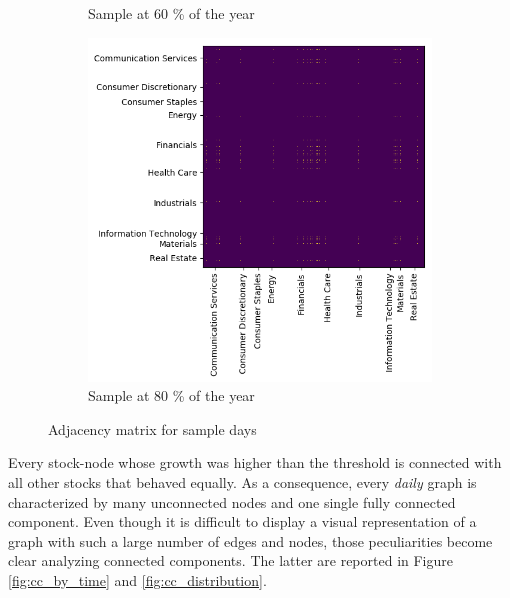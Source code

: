 \documentclass[12pt]{extarticle}
\begin{document}
\begin{figure}[!h]
\begin{subfigure}{0.48\textwidth}
		\caption{Sample at 60 \% of the year} %
	\end{subfigure}
	\begin{subfigure}{0.48\textwidth} %
		\includegraphics[width=\textwidth]{adj_200.png}
		\caption{Sample at 80 \% of the year} %
	\end{subfigure}
	\caption{Adjacency matrix for sample days} %
	\label{fig:adj_matrices}
\end{figure}

Every stock-node whose growth was higher than the threshold is connected with all other stocks that behaved equally. As a consequence, every \textit{daily} graph is characterized by many unconnected nodes and one single fully connected component.
Even though it is difficult to display a visual representation of a graph with such a large number of edges and nodes, those peculiarities become clear analyzing connected components. The latter are reported in Figure \ref{fig:cc_by_time} and \ref{fig:cc_distribution}.
\end{document}
